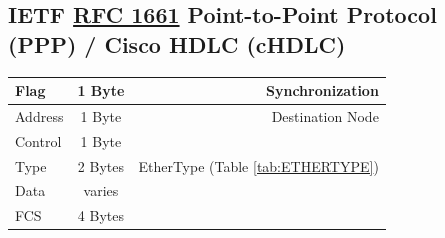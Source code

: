 \documentclass[12pt]{article}
\newcommand{\RFC}[1]{\href{https://datatracker.ietf.org/doc/html/rfc#1}{RFC #1}}
\begin{document}
	\subsection{IETF \RFC{1661} Point-to-Point Protocol (PPP) / Cisco HDLC (cHDLC) \label{subsec:IETF PPP}}
	\begin{table}[H]
	\centering
	\begin{tabular}{| l | c | r |}
	\hline
	Flag		& 1 Byte	& Synchronization\\\hline
	Address	& 1 Byte	& Destination Node\\\hline
	Control	& 1 Byte	&\\\hline
	Type		& 2 Bytes	& EtherType (Table \ref{tab:ETHERTYPE})\\\hline
	Data		& varies	&\\\hline
	FCS		& 4 Bytes	&\\\hline
	\end{tabular}\end{table}





\end{document}
